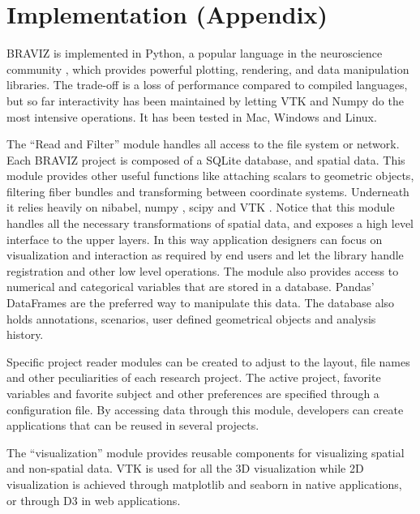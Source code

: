 \section*{Implementation (Appendix)}

BRAVIZ is implemented in Python, a popular language in the neuroscience community \cite{gorgolewski_nipype:_2011}\cite{garyfallidis_dipy_2014}, which provides powerful plotting, rendering, and data manipulation libraries. The trade-off is a loss of performance compared to compiled languages, but so far interactivity has been maintained by letting VTK\cite{schroeder_vtk_1998} and Numpy\cite{van_der_walt_numpy_2011} do the most intensive operations. It has been tested in Mac, Windows and Linux.


The ``Read and Filter'' module handles all access to the file system or network. Each BRAVIZ project is composed of a SQLite database, and spatial data. This module provides other useful functions like attaching scalars to geometric objects, filtering fiber bundles and transforming between coordinate systems. Underneath it relies heavily on nibabel\cite{gorgolewski_nipype:_2011}, numpy\cite{van_der_walt_numpy_2011} , scipy\cite{jones_scipy:_2001}\cite{oliphant_python_2007} and VTK\cite{schroeder_vtk_1998} . Notice that this module handles all the necessary transformations of spatial data, and exposes a high level interface to the upper layers. In this way application designers can focus on visualization and interaction as required by end users and let the library handle registration and other low level operations. The module also provides access to numerical and categorical variables that are stored in a database. Pandas' DataFrames\cite{mckinney_data_2010} are the preferred way to manipulate this data. The database also holds annotations, scenarios, user defined geometrical objects and analysis history. 

Specific project reader modules can be created to adjust to the layout, file names and other peculiarities of each research project. The active project, favorite variables and favorite subject and other preferences are specified through a configuration file.
By accessing data through this module, developers can create applications that can be reused in several projects. 

The ``visualization'' module provides reusable components for visualizing spatial and non-spatial data. VTK is used for all the 3D visualization while 2D visualization is achieved through matplotlib \cite{hunter_matplotlib:_2007} and seaborn\cite{michael_waskom_seaborn:_2014} in native applications, or through D3 \cite{bostock_d3_2011} in web applications.

